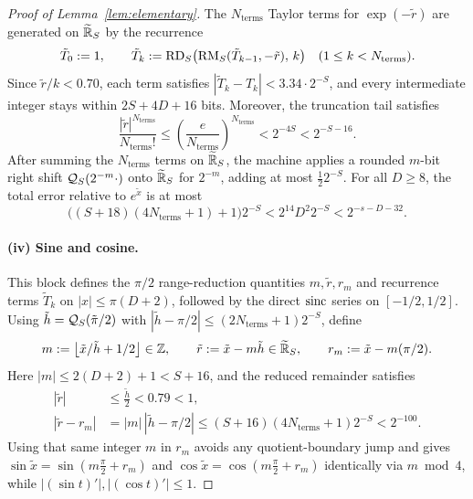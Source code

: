 \begin{proof}[Proof of Lemma~\ref{lem:elementary}]
The $N_{\mathrm{terms}}$ Taylor terms for $\exp(-\tilde{r})$ are generated on $\widetilde{\mathbb{R}}_S$ by the recurrence
\[
  \tilde{T}_0 := 1, \qquad \tilde{T}_k := \operatorname{RD}_S\bigl(\operatorname{RM}_S(\tilde{T}_{k-1}, -\tilde{r}),\, k\bigr) \quad (1 \le k < N_{\mathrm{terms}}).
\]
Since $\tilde{r}/k < 0.70$, each term satisfies $|\tilde{T}_k - T_k| < 3.34 \cdot 2^{-S}$, and every intermediate integer stays within $2S + 4D + 16$ bits. Moreover, the truncation tail satisfies
\[
  \frac{|\tilde{r}|^{N_{\mathrm{terms}}}}{N_{\mathrm{terms}}!} \le \left(\frac{e}{N_{\mathrm{terms}}}\right)^{N_{\mathrm{terms}}} < 2^{-4S} < 2^{-S-16}.
\]
After summing the $N_{\mathrm{terms}}$ terms on $\widetilde{\mathbb{R}}_S$, the machine applies a rounded $m$-bit right shift $\mathcal{Q}_S(2^{-m}\cdot)$ onto $\widetilde{\mathbb{R}}_S$ for $2^{-m}$, adding at most $\frac{1}{2} 2^{-S}$. For all $D \ge 8$, the total error relative to $e^{\tilde{x}}$ is at most
\[
  \bigl((S + 18)(4 N_{\mathrm{terms}} + 1) + 1\bigr) 2^{-S} < 2^{14} D^2 2^{-S} < 2^{-s-D-32}.
\]

\paragraph{(iv) Sine and cosine.}
This block defines the $\pi/2$ range-reduction quantities $m, \tilde{r}, r_m$ and recurrence terms $\tilde{T}_k$ on $|x| \le \pi(D+2)$, followed by the direct $\operatorname{sinc}$ series on $[-1/2, 1/2]$.
Using $\tilde{h} = \mathcal{Q}_S(\tilde{\pi}/2)$ with $|\tilde{h} - \pi/2| \le (2N_{\mathrm{terms}} + 1)2^{-S}$, define
\[
  m := \bigl\lfloor \tilde{x}/\tilde{h} + 1/2 \bigr\rfloor \in \mathbb{Z}, \qquad \tilde{r} := \tilde{x} - m\tilde{h} \in \widetilde{\mathbb{R}}_S, \qquad r_m := \tilde{x} - m(\pi/2).
\]
Here $|m| \le 2(D+2) + 1 < S + 16$, and the reduced remainder satisfies
\begin{align*}
  |\tilde{r}| &\le \frac{\tilde{h}}{2} < 0.79 < 1, \\
  |\tilde{r} - r_m| &= |m|\,|\tilde{h} - \pi/2| \le (S + 16)(4N_{\mathrm{terms}} + 1)2^{-S} < 2^{-100}.
\end{align*}
Using that same integer $m$ in $r_m$ avoids any quotient-boundary jump and gives $\sin\tilde{x} = \sin(m\frac{\pi}{2} + r_m)$ and $\cos\tilde{x} = \cos(m\frac{\pi}{2} + r_m)$ identically via $m \bmod 4$, while $|(\sin t)'|, |(\cos t)'| \le 1$.


\end{proof}
